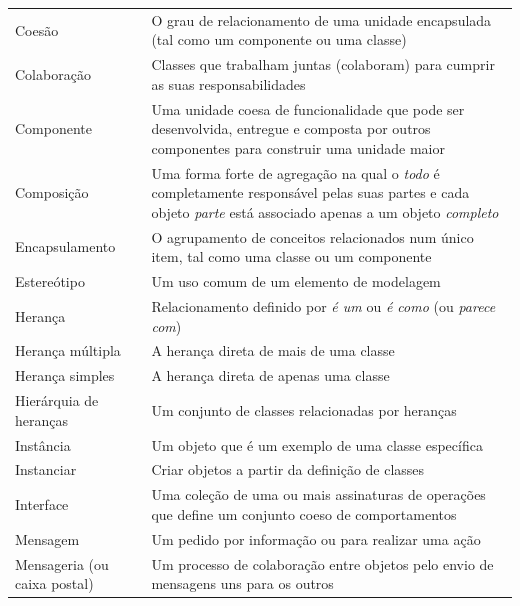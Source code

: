 \begin{longtable}[l]{p{4.6cm}p{11.1cm}}
Coesão & O grau de relacionamento de uma unidade encapsulada (tal como um componente ou uma classe)\\

Colaboração & Classes que trabalham juntas (colaboram) para cumprir as suas responsabilidades\\

Componente & Uma unidade coesa de funcionalidade que pode ser desenvolvida, entregue e composta por outros componentes para construir uma unidade maior\\

Composição & Uma forma forte de agregação na qual o \emph{todo} é completamente responsável pelas suas partes e cada objeto \emph{parte} está associado apenas a um objeto \emph{completo}\\

Encapsulamento & O agrupamento de conceitos relacionados num único item, tal como uma classe ou um componente\\

Estereótipo & Um uso comum de um elemento de modelagem\\

Herança & Relacionamento definido por \emph{é um} ou \emph{é como} (ou \emph{parece com})\\

Herança múltipla & A herança direta de mais de uma classe\\

Herança simples & A herança direta de apenas uma classe\\

Hierárquia de heranças & Um conjunto de classes relacionadas por heranças\\

Instância & Um objeto que é um exemplo de uma classe específica\\

Instanciar & Criar objetos a partir da definição de classes\\

Interface & Uma coleção de uma ou mais assinaturas de operações que define um conjunto coeso de comportamentos\\

Mensagem & Um pedido por informação ou para realizar uma ação\\

Mensageria (ou caixa postal) & Um processo de colaboração entre objetos pelo envio de mensagens uns para os outros\\


\end{longtable}
